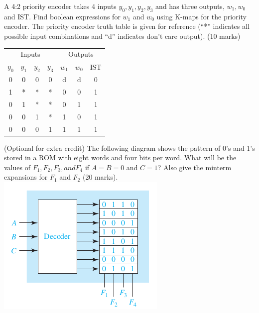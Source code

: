 \begin{prob}
  A 4:2 priority encoder takes 4 inputs $y_0, y_1, y_2, y_3$ and has three outputs, $w_1, w_0$ and $\text{IST}$. Find boolean expressions for $w_1$ and $w_0$ using K-maps for the priority encoder. The priority encoder truth table is given for reference (``*'' indicates all possible input combinations and ``d'' indicates don't care output). (10 marks) \\
  \begin{tabular}{cccc|ccc}
    \toprule
    \multicolumn{4}{c|}{Inputs} & \multicolumn{3}{c}{Outputs}\\
    $y_0$ & $y_1$ & $y_2$ & $y_3$ & $w_1$ & $w_0$ & $\text{IST}$ \\
    \midrule
    0 & 0 & 0 & 0 & d & d & 0\\
    1 & * & * & * & 0 & 0 & 1\\
    0 & 1 & * & * & 0 & 1 & 1\\
    0 & 0 & 1 & * & 1 & 0 & 1\\
    0 & 0 & 0 & 1 & 1 & 1 & 1\\
    \midrule
  \end{tabular}
\end{prob}
\newpage

\begin{prob}
  (Optional for extra credit) The following diagram shows the pattern of 0’s and 1’s stored in a ROM
  with eight words and four bits per word. What will be the values of $F_1 , F_2 ,
  F_3 , and F_4$ if $A= B = 0$ and $C = 1$?
  Also give the minterm expansions for $F_1$ and $F_2$ (20 marks).\\
  \includegraphics[width=0.4\linewidth]{./media/ROM-minterms.png}
\end{prob}
\newpage

